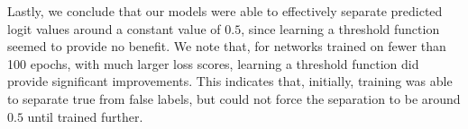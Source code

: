 \documentclass[11pt]{article}
\begin{document}
Lastly, we conclude that our models were able to effectively separate predicted logit values around a constant value of $0.5$, since learning a threshold function seemed to provide no benefit. We note that, for networks trained on fewer than 100 epochs, with much larger loss scores, learning a threshold function did provide significant improvements. This indicates that, initially, training was able to separate true from false labels, but could not force the separation to be around $0.5$ until trained further.


\newpage
\printbibliography
\end{document}

